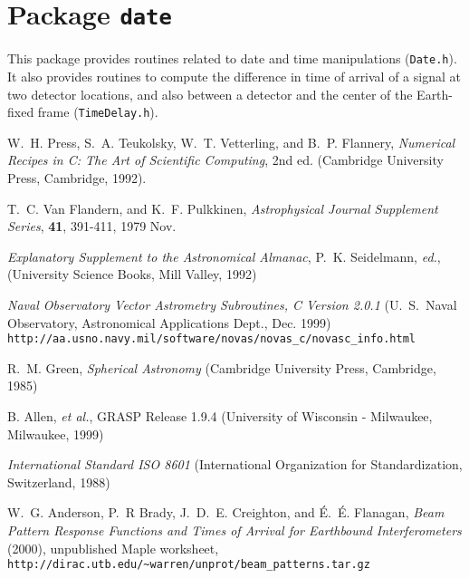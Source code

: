 
\chapter{Package \texttt{date}}

This package provides routines related to date and time manipulations
(\texttt{Date.h}).  It also provides routines to compute the
difference in time of arrival of a signal at two detector locations,
and also between a detector and the center of the Earth-fixed frame
(\texttt{TimeDelay.h}).

\newpage

\newpage

\newpage\begin{thebibliography}{1}
  
  W.~H. Press, S.~A. Teukolsky, W.~T. Vetterling, and B.~P. Flannery,
  \textit{Numerical Recipes in C: The Art of Scientific Computing}, 2nd ed.
  (Cambridge University Press, Cambridge, 1992).

  T.~C. Van Flandern, and K.~F. Pulkkinen, 
  \textit{Astrophysical Journal Supplement Series}, \textbf{41},
  391-411, 1979 Nov.
  
  \textit{Explanatory Supplement to the Astronomical Almanac}, P.~K. Seidelmann,
  \textit{ed.}, (University Science Books, Mill Valley, 1992)

  \textit{Naval Observatory Vector Astrometry Subroutines, C Version 2.0.1}
  (U.~S.~Naval Observatory, Astronomical Applications Dept., Dec. 1999)
  \verb+http://aa.usno.navy.mil/software/novas/novas_c/novasc_info.html+
  
  R.~M. Green, \textit{Spherical Astronomy} (Cambridge University Press,
  Cambridge, 1985)
  
  B. Allen, \textit{et al.}, GRASP Release 1.9.4 (University of Wisconsin
  - Milwaukee, Milwaukee, 1999)
  
  \textit{International Standard ISO 8601} (International Organization for
  Standardization, Switzerland, 1988)
  
  W.~G. Anderson, P.~R Brady, J.~D.~E. Creighton, and \'E.~\'E. Flanagan,
  \emph{Beam Pattern Response Functions and Times of Arrival for Earthbound Interferometers} 
  (2000), unpublished Maple worksheet,
  \verb+http://dirac.utb.edu/~warren/unprot/beam_patterns.tar.gz+
  
\end{thebibliography}

